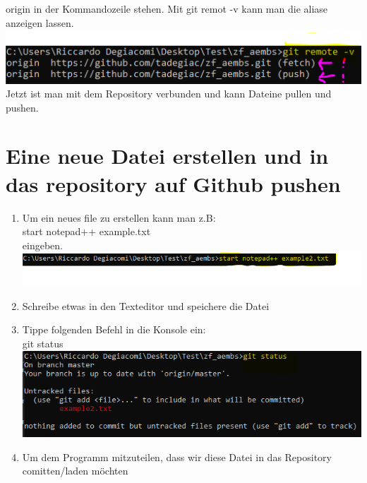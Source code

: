 \documentclass[a4paper, 8pt]{extarticle}
\begin{document}
\begin{multicols*}{3}
\begin{enumerate}
                            origin in der Kommandozeile stehen.
                            Mit git remot -v kann man die aliase anzeigen lassen.
                                \includegraphics[width=1\linewidth, left]{img/git_remote_-V.PNG}
                            Jetzt ist man mit dem Repository verbunden und kann Dateine pullen und pushen.
                \end{enumerate}
            
            \section{Eine neue Datei erstellen und in das repository auf Github pushen}
                 \begin{enumerate}  
                    \item   Um ein neues file zu erstellen kann man z.B:\\
                            start notepad++ example.txt\\
                            eingeben.\\
                                \includegraphics[width=1\linewidth, left]{img/cmd_start_programm.PNG} 
                    \item   Schreibe etwas in den Texteditor und speichere die Datei
                    \item   Tippe folgenden Befehl in die Konsole ein:\\
                            git status\\
                                \includegraphics[width=1\linewidth, left]{img/git_status.PNG} 
                    \item   Um dem Programm mitzuteilen, dass wir diese Datei in das Repository comitten/laden möchten 

\end{enumerate}
\end{multicols*}
\end{document}
